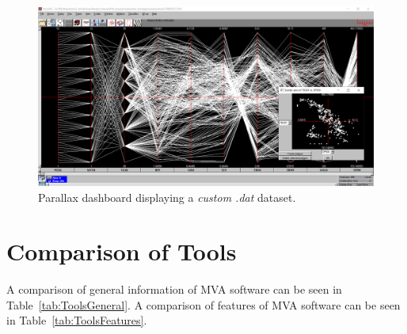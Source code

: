 \begin{figure}[tp]
\centering
\includegraphics[keepaspectratio,width=\linewidth,height=\halfh]
{images/screenshot-parallax.png}

\caption[Parallax Dashboard]
{%
Parallax dashboard displaying a \emph{custom .dat} dataset.
}
\label{fig:ScreenshotParallax}
\end{figure}




\section{Comparison of Tools}

A comparison of general information of MVA software can be seen in
Table~\ref{tab:ToolsGeneral}. A comparison of features of MVA software can
be seen in Table~\ref{tab:ToolsFeatures}.




